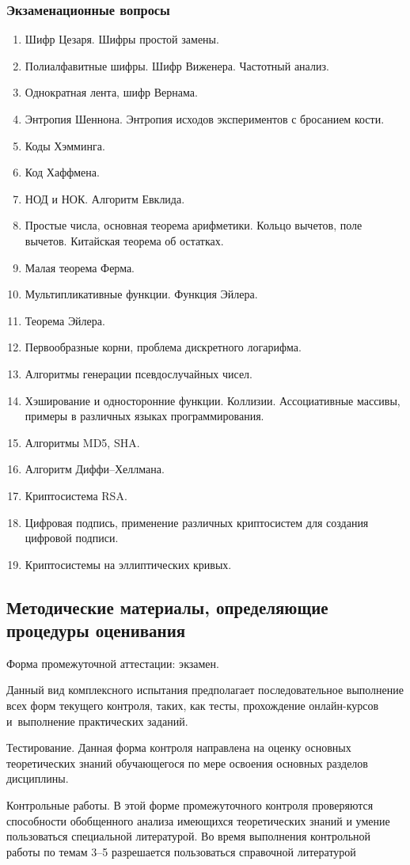 \documentclass[a4paper,12pt]{article}
\begin{document}
\subsubsection*{Экзаменационные вопросы}
\begin{enumerate}
\item
Шифр Цезаря. Шифры простой замены.
\item
Полиалфавитные шифры. Шифр Виженера. Частотный анализ.
\item
Однократная лента, шифр Вернама.
\item
Энтропия Шеннона. Энтропия исходов экспериментов с бросанием кости.
\item
Коды Хэмминга.
\item
Код Хаффмена.
\item
НОД и НОК. Алгоритм Евклида.
\item
Простые числа, основная теорема арифметики. Кольцо вычетов, поле вычетов. Китайская теорема об остатках.
\item
Малая теорема Ферма.
\item
Мультипликативные функции. Функция Эйлера.
\item
Теорема Эйлера.
\item
Первообразные корни, проблема дискретного логарифма.
\item
Алгоритмы генерации псевдослучайных чисел.
\item
Хэширование и односторонние функции. Коллизии. Ассоциативные массивы, примеры в различных языках программирования.
\item
Алгоритмы MD5, SHA.
\item
Алгоритм Диффи--Хеллмана.
\item
Криптосистема RSA.
\item
Цифровая подпись, применение различных криптосистем для создания цифровой подписи.
\item
Криптосистемы на эллиптических кривых.
\end{enumerate}



\subsection{Методические материалы, определяющие процедуры оценивания}

Форма промежуточной аттестации: экзамен.
\par
Данный вид комплексного испытания предполагает последовательное выполнение
всех форм текущего контроля, таких, как тесты, прохождение онлайн-курсов
и~выполнение практических заданий.
\par
Тестирование. Данная форма контроля направлена на оценку основных
теоретических знаний обучающегося по мере освоения основных разделов дисциплины.
\par
Контрольные работы. В этой форме промежуточного контроля проверяются способности
обобщенного анализа имеющихся теоретических знаний и умение пользоваться
специальной литературой. Во время выполнения контрольной работы по темам 3--5 разрешается
пользоваться справочной литературой
\end{document}

